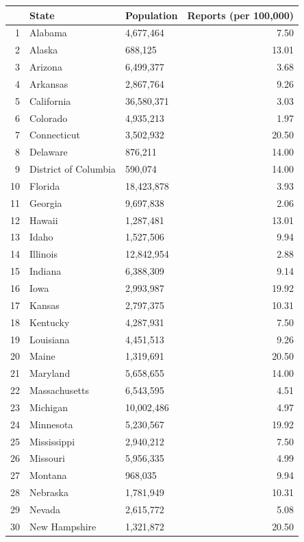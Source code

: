 \documentclass{article}
\begin{document}
\begin{table}[ht]
\centering
\begin{tabular}{rllr}
  \hline
 & State & Population & Reports (per 100,000) \\ 
  \hline
1 & Alabama & 4,677,464 & 7.50 \\ 
  2 & Alaska & 688,125 & 13.01 \\ 
  3 & Arizona & 6,499,377 & 3.68 \\ 
  4 & Arkansas & 2,867,764 & 9.26 \\ 
  5 & California & 36,580,371 & 3.03 \\ 
  6 & Colorado & 4,935,213 & 1.97 \\ 
  7 & Connecticut & 3,502,932 & 20.50 \\ 
  8 & Delaware & 876,211 & 14.00 \\ 
  9 & District of Columbia & 590,074 & 14.00 \\ 
  10 & Florida & 18,423,878 & 3.93 \\ 
  11 & Georgia & 9,697,838 & 2.06 \\ 
  12 & Hawaii & 1,287,481 & 13.01 \\ 
  13 & Idaho & 1,527,506 & 9.94 \\ 
  14 & Illinois & 12,842,954 & 2.88 \\ 
  15 & Indiana & 6,388,309 & 9.14 \\ 
  16 & Iowa & 2,993,987 & 19.92 \\ 
  17 & Kansas & 2,797,375 & 10.31 \\ 
  18 & Kentucky & 4,287,931 & 7.50 \\ 
  19 & Louisiana & 4,451,513 & 9.26 \\ 
  20 & Maine & 1,319,691 & 20.50 \\ 
  21 & Maryland & 5,658,655 & 14.00 \\ 
  22 & Massachusetts & 6,543,595 & 4.51 \\ 
  23 & Michigan & 10,002,486 & 4.97 \\ 
  24 & Minnesota & 5,230,567 & 19.92 \\ 
  25 & Mississippi & 2,940,212 & 7.50 \\ 
  26 & Missouri & 5,956,335 & 4.99 \\ 
  27 & Montana & 968,035 & 9.94 \\ 
  28 & Nebraska & 1,781,949 & 10.31 \\ 
  29 & Nevada & 2,615,772 & 5.08 \\ 
  30 & New Hampshire & 1,321,872 & 20.50 \\ 

\end{tabular}
\end{table}
\end{document}

